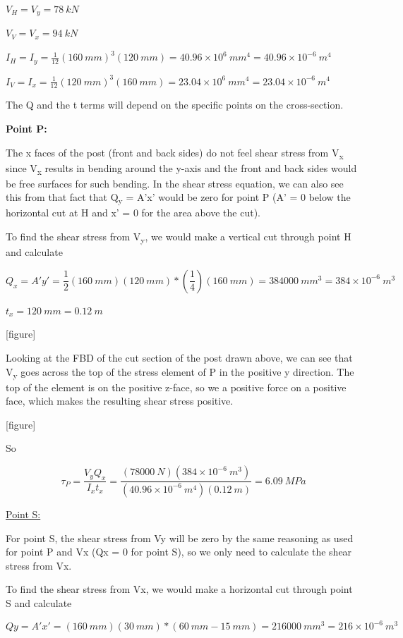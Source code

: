 \documentclass[
  letterpaper,
  DIV=11,
  numbers=noendperiod]{scrreprt}
\theoremstyle{definition}
\theoremstyle{remark}
\begin{document}
\begin{tcolorbox}
\begin{tcolorbox}
\(V_H = V_y = 78{~kN}\)

\(V_V = V_x = 94{~kN}\)

\(I_H=I_y=\frac{1}{12}(160{~mm})^3(120{~mm})=40.96 \times 10^6{~mm}^4=40.96 \times 10^{-6}{~m}^4\)

\(I_V=I_x=\frac{1}{12}(120{~mm})^3(160{~mm})=23.04 \times10^6{~mm}^4=23.04 \times 10^{-6}{~m}^4\)

The Q and the t terms will depend on the specific points on the
cross-section.

\textbf{Point P:}

The x faces of the post (front and back sides) do not feel shear stress
from V\textsubscript{x} since V\textsubscript{x} results in bending
around the y-axis and the front and back sides would be free surfaces
for such bending. In the shear stress equation, we can also see this
from that fact that Q\textsubscript{y} = A'x' would be zero for point P
(A' = 0 below the horizontal cut at H and x' = 0 for the area above the
cut).

To find the shear stress from V\textsubscript{y}, we would make a
vertical cut through point H and calculate

\[
Q_x=A'y'=\frac{1}{2}(160{~mm})(120{~mm})*\left(\frac{1}{4}\right)(160{~mm})=384000{~mm}^3=384 \times 10^{-6}{~m}^3
\]

\(t_x = 120{~mm} = 0.12{~m}\)

{[}figure{]}

Looking at the FBD of the cut section of the post drawn above, we can
see that V\textsubscript{y} goes across the top of the stress element of
P in the positive y direction. The top of the element is on the positive
z-face, so we a positive force on a positive face, which makes the
resulting shear stress positive.

{[}figure{]}

So

\[
\tau_P=\frac{V_y Q_x}{I_x t_x}=\frac{(78000{~N})(384 \times 10^{-6}{~m}^3)}{(40.96 \times 10^{-6}{~m}^4)(0.12{~m})}=6.09{~MPa}
\]

\ul{Point S:}

For point S, the shear stress from Vy will be zero by the same reasoning
as used for point P and Vx (Qx = 0 for point S), so we only need to
calculate the shear stress from Vx.

To find the shear stress from Vx, we would make a horizontal cut through
point S and calculate

\[
Q y=A'x'=(160{~mm})(30{~mm})*(60{~mm}-15{~mm})=216000{~mm}^3=216 \times 10^{-6}{~m}^3
\]


\end{tcolorbox}
\end{tcolorbox}
\end{document}
